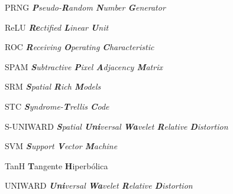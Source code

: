 \begin{siglas}
	\item[PRNG] \hspace{9pt}\textit{\textbf{P}seudo-\textbf{R}andom \textbf{N}umber \textbf{G}enerator}
	\item[ReLU] \hspace{9pt}\textit{\textbf{Re}ctified \textbf{L}inear \textbf{U}nit}
	\item[ROC] \hspace{9pt}\textit{\textbf{R}eceiving \textbf{O}perating \textbf{C}haracteristic}
	\item[SPAM] \hspace{9pt}\textit{\textbf{S}ubtractive \textbf{P}ixel \textbf{A}djacency \textbf{M}atrix}
	\item[SRM] \hspace{9pt}\textit{\textbf{S}patial \textbf{R}ich \textbf{M}odels}
	\item[STC] \hspace{9pt}\textit{\textbf{S}yndrome-\textbf{T}rellis \textbf{C}ode}
	\item[S-UNIWARD] \textit{\textbf{S}patial \textbf{Uni}versal \textbf{Wa}velet \textbf{R}elative \textbf{D}istortion}
	\item[SVM] \hspace{9pt}\textit{\textbf{S}upport \textbf{V}ector \textbf{M}achine}
	\item[TanH] \hspace{9pt}\textbf{T}angente \textbf{H}iperbólica
	\item[UNIWARD] \hspace{9pt}\textit{\textbf{Uni}versal \textbf{Wa}velet \textbf{R}elative \textbf{D}istortion}
\end{siglas}


